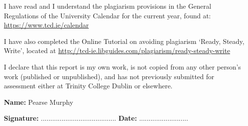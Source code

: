 \begin{abstracts}

\end{abstracts}


\restoregeometry





\begin{declaration}      

I have read and I understand the plagiarism provisions in the General Regulations of the University Calendar for the current year, found at: \url{https://www.tcd.ie/calendar}

I have also completed the Online Tutorial on avoiding plagiarism ‘Ready, Steady, Write’, located at \url{http://tcd-ie.libguides.com/plagiarism/ready-steady-write}  

\vspace{10mm}

I declare that this report is my own work, is not copied from any other person's work (published or unpublished), and has not previously submitted for assessment either at Trinity College Dublin or elsewhere.

\vspace{30mm}

\textbf{Name:} Pearse Murphy

\vspace{15mm}

\textbf{Signature:}  ........................................		\textbf{Date:}  ..........................

\end{declaration}

